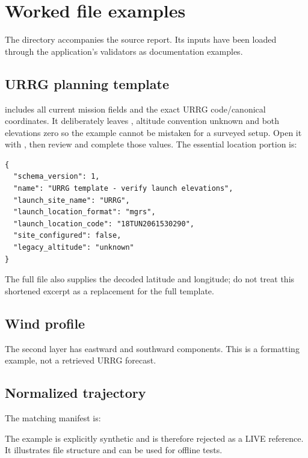 \section{Worked file examples}\label{app:examples}
The  directory accompanies the source report. Its inputs have been
loaded through the application's validators as documentation examples.

\subsection{URRG planning template}
 includes all current mission fields and the
exact URRG code/canonical coordinates. It deliberately leaves
, altitude convention unknown and both elevations
zero so the example cannot be mistaken for a surveyed setup. Open it with
, then review and complete those values. The essential location
portion is:
\begin{lstlisting}
{
  "schema_version": 1,
  "name": "URRG template - verify launch elevations",
  "launch_site_name": "URRG",
  "launch_location_format": "mgrs",
  "launch_location_code": "18TUN2061530290",
  "site_configured": false,
  "legacy_altitude": "unknown"
}
\end{lstlisting}
The full file also supplies the decoded latitude and longitude; do not treat
this shortened excerpt as a replacement for the full template.

\subsection{Wind profile}
\noindent\begin{minipage}{\linewidth}

\end{minipage}
The second layer has eastward and southward components. This is a formatting
example, not a retrieved URRG forecast.

\subsection{Normalized trajectory}

The matching manifest is:

The example is explicitly synthetic and is therefore rejected as a LIVE
reference. It illustrates file structure and can be used for offline tests.

